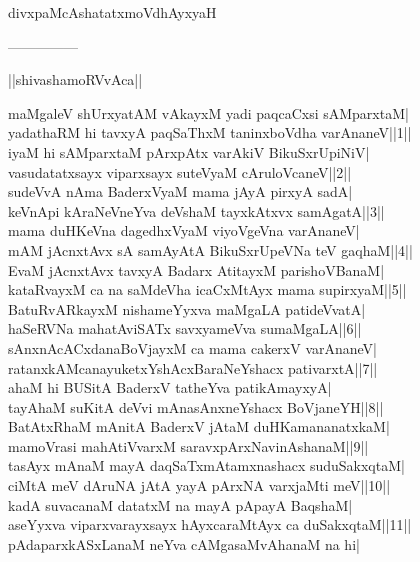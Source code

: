 \documentclass{article}
\begin{document}
\begin{center}
divxpaMcAshatatxmoVdhAyxyaH
\end{center}

\begin{center}
---------------
\end{center}

\begin{center}
||shivashamoRVvAca||
\end{center}

maMgaleV shUrxyatAM vAkayxM yadi paqcaCxsi sAMparxtaM|\\
yadathaRM hi tavxyA paqSaThxM taninxboVdha varAnaneV||1||\\
iyaM hi sAMparxtaM pArxpAtx varAkiV BikuSxrUpiNiV|\\
vasudatatxsayx viparxsayx suteVyaM cAruloVcaneV||2||\\
sudeVvA nAma BaderxVyaM mama jAyA pirxyA sadA|\\
keVnApi kAraNeVneYva deVshaM tayxkAtxvx samAgatA||3||\\
mama duHKeVna dagedhxVyaM viyoVgeVna varAnaneV|\\
mAM jAcnxtAvx sA samAyAtA BikuSxrUpeVNa teV gaqhaM||4||\\
EvaM jAcnxtAvx tavxyA Badarx AtitayxM parishoVBanaM|\\
kataRvayxM ca na saMdeVha icaCxMtAyx mama supirxyaM||5||\\
BatuRvARkayxM nishameYyxva maMgaLA patideVvatA|\\
haSeRVNa mahatAviSATx savxyameVva sumaMgaLA||6||\\
sAnxnAcACxdanaBoVjayxM ca mama cakerxV varAnaneV|\\
ratanxkAMcanayuketxYshAcxBaraNeYshacx pativarxtA||7||\\
ahaM hi BUSitA BaderxV tatheYva patikAmayxyA|\\
tayAhaM suKitA deVvi mAnasAnxneYshacx BoVjaneYH||8||\\
BatAtxRhaM mAnitA BaderxV jAtaM duHKamananatxkaM|\\
mamoVrasi mahAtiVvarxM saravxpArxNavinAshanaM||9||\\
tasAyx mAnaM mayA daqSaTxmAtamxnashacx suduSakxqtaM|\\
ciMtA meV dAruNA jAtA yayA pArxNA varxjaMti meV||10||\\
kadA suvacanaM datatxM na mayA pApayA BaqshaM|\\
aseYyxva viparxvarayxsayx hAyxcaraMtAyx ca duSakxqtaM||11||\\
pAdaparxkASxLanaM neYva cAMgasaMvAhanaM na hi|\\
\end{document}
